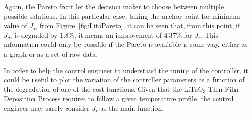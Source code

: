 Again, the Pareto front let the decision maker to choose between multiple possible solutions. In this particular case, taking the anchor point for minimum value of $J_{di}$ from Figure~\ref{fig:LitaPareto}, it can be seen that, from this point, if $J_{di}$ is degraded by $1.8\%$, it means an improvement of $4.37\%$ for $J_{r}$. This information could only be possible if the Pareto is available is some way, either as a graph or as a set of raw data.

In order to help the control engineer to understand the tuning of the controller, it could be useful to plot the variation of the controller parameters as a function of the degradation of one of the cost functions. Given that the LiTaO$_3$ Thin Film Deposition Process requires to follow a given temperature profile, the control engineer may surely consider $J_r$ as the main function.
%
